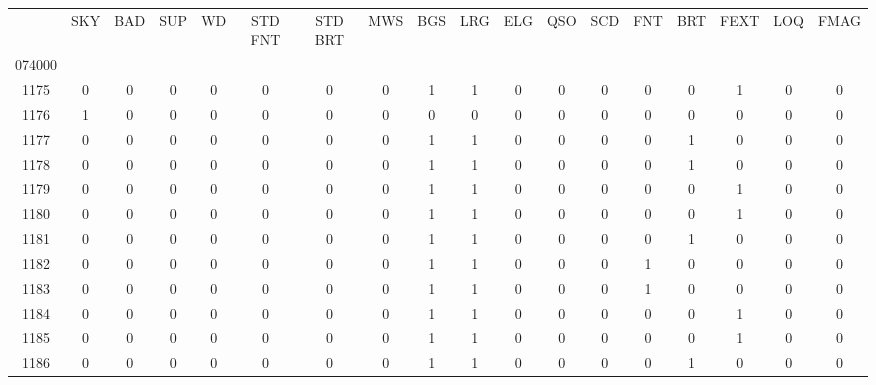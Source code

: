 \begin{tabular}{|c|c|c|c|c|c|c|c|c|c|c|c|c|c|c|c|c|c|}\toprule{} &  SKY &  BAD &  SUP &  WD &  STD FNT &  STD BRT &  MWS &  BGS &  LRG &  ELG &  QSO &  SCD &  FNT &  BRT &  FEXT &  LOQ &  FMAG \\074000 &      &      &      &     &          &          &      &      &      &      &      &      &      &      &       &      &       \\\midrule1175   &    0 &    0 &    0 &   0 &        0 &        0 &    0 &    1 &    1 &    0 &    0 &    0 &    0 &    0 &     1 &    0 &     0 \\
\midrule
1176   &    1 &    0 &    0 &   0 &        0 &        0 &    0 &    0 &    0 &    0 &    0 &    0 &    0 &    0 &     0 &    0 &     0 \\
\midrule
1177   &    0 &    0 &    0 &   0 &        0 &        0 &    0 &    1 &    1 &    0 &    0 &    0 &    0 &    1 &     0 &    0 &     0 \\
\midrule
1178   &    0 &    0 &    0 &   0 &        0 &        0 &    0 &    1 &    1 &    0 &    0 &    0 &    0 &    1 &     0 &    0 &     0 \\
\midrule
1179   &    0 &    0 &    0 &   0 &        0 &        0 &    0 &    1 &    1 &    0 &    0 &    0 &    0 &    0 &     1 &    0 &     0 \\
\midrule
1180   &    0 &    0 &    0 &   0 &        0 &        0 &    0 &    1 &    1 &    0 &    0 &    0 &    0 &    0 &     1 &    0 &     0 \\
\midrule
1181   &    0 &    0 &    0 &   0 &        0 &        0 &    0 &    1 &    1 &    0 &    0 &    0 &    0 &    1 &     0 &    0 &     0 \\
\midrule
1182   &    0 &    0 &    0 &   0 &        0 &        0 &    0 &    1 &    1 &    0 &    0 &    0 &    1 &    0 &     0 &    0 &     0 \\
\midrule
1183   &    0 &    0 &    0 &   0 &        0 &        0 &    0 &    1 &    1 &    0 &    0 &    0 &    1 &    0 &     0 &    0 &     0 \\
\midrule
1184   &    0 &    0 &    0 &   0 &        0 &        0 &    0 &    1 &    1 &    0 &    0 &    0 &    0 &    0 &     1 &    0 &     0 \\
\midrule
1185   &    0 &    0 &    0 &   0 &        0 &        0 &    0 &    1 &    1 &    0 &    0 &    0 &    0 &    0 &     1 &    0 &     0 \\
\midrule
1186   &    0 &    0 &    0 &   0 &        0 &        0 &    0 &    1 &    1 &    0 &    0 &    0 &    0 &    1 &     0 &    0 &     0 \\

\end{tabular}
